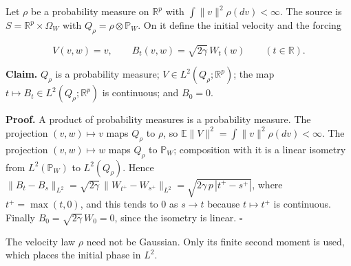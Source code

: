 \documentclass[11pt,a4paper]{article}
\begin{document}
Let \(\rho\) be a probability measure on \(\mathbb R^p\) with \(\int\|v\|^2\rho(dv)<\infty\). The source is \(S=\mathbb R^p\times\Omega_W\) with \(Q_\rho=\rho\otimes\mathbb P_W\). On it define the initial velocity and the forcing


\[V(v,w)=v,\qquad B_t(v,w)=\sqrt{2\gamma}\,W_t(w)\qquad(t\in\mathbb R).\]


\textbf{Claim.} \(Q_\rho\) is a probability measure; \(V\in L^2(Q_\rho;\mathbb R^p)\); the map \(t\mapsto B_t\in L^2(Q_\rho;\mathbb R^p)\) is continuous; and \(B_0=0\).




\textbf{Proof.} A product of probability measures is a probability measure. The projection \((v,w)\mapsto v\) maps \(Q_\rho\) to \(\rho\), so \(\mathbb E\|V\|^2=\int\|v\|^2\rho(dv)<\infty\). The projection \((v,w)\mapsto w\) maps \(Q_\rho\) to \(\mathbb P_W\); composition with it is a linear isometry from \(L^2(\mathbb P_W)\) to \(L^2(Q_\rho)\). Hence \(\|B_t-B_s\|_{L^2}=\sqrt{2\gamma}\,\|W_{t^+}-W_{s^+}\|_{L^2}=\sqrt{2\gamma\,p\,|t^+-s^+|}\), where \(t^+=\max(t,0)\), and this tends to \(0\) as \(s\to t\) because \(t\mapsto t^+\) is continuous. Finally \(B_0=\sqrt{2\gamma}\,W_0=0\), since the isometry is linear. \(\square\)




The velocity law \(\rho\) need not be Gaussian. Only its finite second moment is used, which places the initial phase in \(L^2\).
\end{document}
